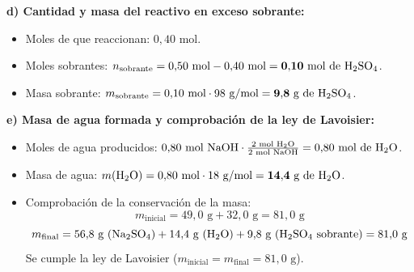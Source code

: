 ﻿\documentclass[11pt,a4paper]{article}
\begin{document}
\vspace{0.1cm}
\noindent\textbf{d) Cantidad y masa del reactivo en exceso sobrante:}
\begin{itemize}[leftmargin=1.5em, itemsep=3pt]
    \item Moles de  que reaccionan: $0{,}40\text{ mol}$.
    \item Moles sobrantes: $n_{\text{sobrante}} = 0{,}50\text{ mol} - 0{,}40\text{ mol} = \mathbf{0{,}10\text{ mol de \ce{H2SO4}}}$.
    \item Masa sobrante: $m_{\text{sobrante}} = 0{,}10\text{ mol} \cdot 98\text{ g/mol} = \mathbf{9{,}8\text{ g de \ce{H2SO4}}}$.
\end{itemize}

\vspace{0.1cm}
\noindent\textbf{e) Masa de agua formada y comprobación de la ley de Lavoisier:}
\begin{itemize}[leftmargin=1.5em, itemsep=3pt]
    \item Moles de agua producidos: $0{,}80\text{ mol \ce{NaOH}} \cdot \frac{2\text{ mol \ce{H2O}}}{2\text{ mol \ce{NaOH}}} = 0{,}80\text{ mol de \ce{H2O}}$.
    \item Masa de agua: $m(\ce{H2O}) = 0{,}80\text{ mol} \cdot 18\text{ g/mol} = \mathbf{14{,}4\text{ g de \ce{H2O}}}$.
    \item Comprobación de la conservación de la masa:
    \[
    m_{\text{inicial}} = 49{,}0\text{ g} + 32{,}0\text{ g} = 81{,}0\text{ g}
    \]
    \[
    m_{\text{final}} = 56{,}8\text{ g (\ce{Na2SO4})} + 14{,}4\text{ g (\ce{H2O})} + 9{,}8\text{ g (\ce{H2SO4} sobrante)} = 81{,}0\text{ g}
    \]
    Se cumple la ley de Lavoisier ($m_{\text{inicial}} = m_{\text{final}} = 81{,}0\text{ g}$).
\end{itemize}
\end{document}

